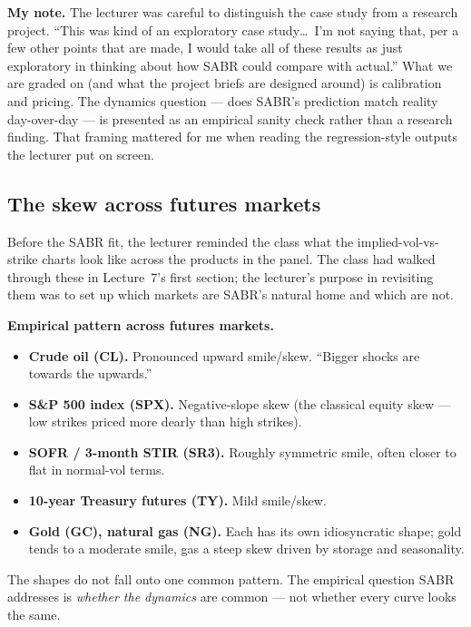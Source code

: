 \begin{checkpoint}
\textbf{My note.} The lecturer was careful to distinguish the case
study from a research project. ``This was kind of an exploratory
case study\ldots\ I'm not saying that, per a few other points that are
made, I would take all of these results as just exploratory in
thinking about how SABR could compare with actual.'' What we are
graded on (and what the project briefs are designed around) is
calibration and pricing. The dynamics question --- does SABR's
prediction match reality day-over-day --- is presented as an
empirical sanity check rather than a research finding. That framing
mattered for me when reading the regression-style outputs the
lecturer put on screen.
\end{checkpoint}

\subsection{The skew across futures markets}\label{L8-sec:skewacross}

Before the SABR fit, the lecturer reminded the class what the
implied-vol-vs-strike charts look like across the products in the
panel. The class had walked through these in Lecture~7's first
section; the lecturer's purpose in revisiting them was to set up
which markets are SABR's natural home and which are not.

\begin{keyblock}
\textbf{Empirical pattern across futures markets.}
\begin{itemize}
  \item \textbf{Crude oil (CL).} Pronounced upward smile/skew.
        ``Bigger shocks are towards the upwards.''
  \item \textbf{S\&P 500 index (SPX).} Negative-slope skew (the
        classical equity skew --- low strikes priced more dearly
        than high strikes).
  \item \textbf{SOFR / 3-month STIR (SR3).} Roughly
        symmetric smile, often closer to flat in normal-vol terms.
  \item \textbf{10-year Treasury futures (TY).} Mild smile/skew.
  \item \textbf{Gold (GC), natural gas (NG).} Each has its own
        idiosyncratic shape; gold tends to a moderate smile, gas a
        steep skew driven by storage and seasonality.
\end{itemize}
The shapes do not fall onto one common pattern. The empirical
question SABR addresses is \emph{whether the dynamics} are
common --- not whether every curve looks the same.
\end{keyblock}

